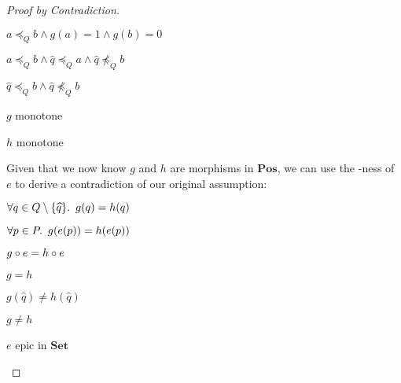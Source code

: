 \begin{lemma}
\begin{proof}[Proof by Contradiction]
\begin{itemize}
\begin{itemize}
          \step[\imps]
            $a\preceq_Qb\wedge g(a) = 1\wedge g(b) = 0$

          \step[\imps]
            $a\preceq_Qb\wedge \widehat{q}\preceq_Qa\wedge \widehat{q}\npreceq_Qb$

          \step[\imps]
            $\widehat{q}\preceq_Qb\wedge \widehat{q}\npreceq_Qb$
        \end{itemize}

      \step[\contras] $g$ monotone
        \marginnote{\Contra}

      \step $h$ monotone

      \addtolength{\itemsep}{.5\baselineskip}
      \step Given that we now know $g$ and $h$ are morphisms in $\mathbf{Pos}$, we can use the \Epic-ness of $e$ to derive a contradiction of our original assumption:

      \step
        \begin{itemize}
          \subp{\dagger}
            $\forall q\in Q\setminus\{\widehat{q}\}\ldotp~g(q) = h(q)$

          \step[\imps]
            $\forall p\in P\ldotp~g(e(p)) = h(e(p))$


          \step[\iffs]
            $g\circ e = h\circ e$
            \marginnote{\Def-$=$}

          \step[\imps]
            $g = h$
        \end{itemize}
      \addtolength{\itemsep}{-.5\baselineskip}

      \step
        \begin{itemize}
          \subp{\ddagger}
            $g(\widehat{q})\neq h(\widehat{q})$

          \step[\imps]
            $g\neq h$
            \marginnote{\Def-$\neq$}
        \end{itemize}

        \step[\contras] $e$ epic in $\mathbf{Set}$
          \qedhere
          \marginnote{\Contra-$\dagger$}
    \end{itemize}
  \end{proof}
\end{lemma}

